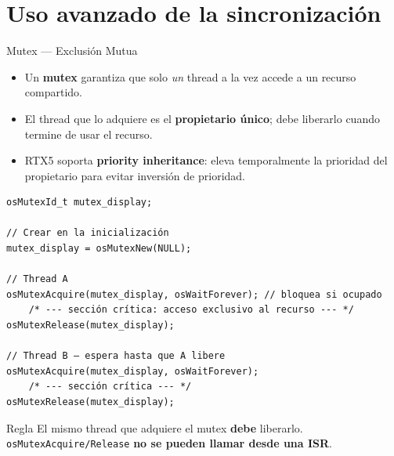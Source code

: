 \section[Avanzado]{Uso avanzado de la sincronización}
\begin{frame}[fragile]{Mutex — Exclusión Mutua}
    \begin{itemize}
        \item Un \textbf{mutex} garantiza que solo \emph{un} thread a la
              vez accede a un recurso compartido.
        \item El thread que lo adquiere es el \textbf{propietario único};
              debe liberarlo cuando termine de usar el recurso.
        \item RTX5 soporta \textbf{priority inheritance}: eleva
              temporalmente la prioridad del propietario para evitar
              inversión de prioridad.
    \end{itemize}
    \begin{verbatim}
osMutexId_t mutex_display;

// Crear en la inicialización
mutex_display = osMutexNew(NULL);

// Thread A
osMutexAcquire(mutex_display, osWaitForever); // bloquea si ocupado
    /* --- sección crítica: acceso exclusivo al recurso --- */
osMutexRelease(mutex_display);

// Thread B — espera hasta que A libere
osMutexAcquire(mutex_display, osWaitForever);
    /* --- sección crítica --- */
osMutexRelease(mutex_display);
    \end{verbatim}
    \scriptsize
    \begin{alertblock}{Regla}
        El mismo thread que adquiere el mutex \textbf{debe} liberarlo.
        \texttt{osMutexAcquire/Release} \textbf{no se pueden llamar
        desde una ISR}.
    \end{alertblock}
\end{frame}

